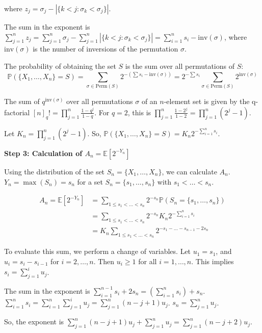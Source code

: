 \documentclass[12pt,a4paper]{article}
\theoremstyle{definition}
\begin{document}
        where $z_j = \sigma_j - |\{k<j : \sigma_k < \sigma_j\}|$.

        The sum in the exponent is $\sum_{j=1}^n z_j = \sum_{j=1}^n \sigma_j - \sum_{j=1}^n |\{k<j : \sigma_k < \sigma_j\}| = \sum_{i=1}^n s_i - \text{inv}(\sigma)$, where $\text{inv}(\sigma)$ is the number of inversions of the permutation $\sigma$.

        The probability of obtaining the set $S$ is the sum over all permutations of $S$:
        \[ \mathbb{P}(\{X_1, \ldots, X_n\}=S) = \sum_{\sigma \in \text{Perm}(S)} 2^{-(\sum s_i - \text{inv}(\sigma))} = 2^{-\sum s_i} \sum_{\sigma \in \text{Perm}(S)} 2^{\text{inv}(\sigma)} \]

        The sum of $q^{\text{inv}(\sigma)}$ over all permutations $\sigma$ of an $n$-element set is given by the q-factorial $[n]_q! = \prod_{j=1}^n \frac{1-q^j}{1-q}$. For $q=2$, this is $\prod_{j=1}^n \frac{1-2^j}{1-2} = \prod_{j=1}^n (2^j-1)$.

        Let $K_n = \prod_{j=1}^n (2^j-1)$. So, $\mathbb{P}(\{X_1, \ldots, X_n\}=S) = K_n 2^{-\sum_{i=1}^n s_i}$.

        \textbf{Step 3: Calculation of $A_n = \mathbb{E}[2^{-Y_n}]$}

        Using the distribution of the set $S_n = \{X_1, \ldots, X_n\}$, we can calculate $A_n$.
        $Y_n = \max(S_n) = s_n$ for a set $S_n=\{s_1, \ldots, s_n\}$ with $s_1 < \ldots < s_n$.

        \begin{align*}
            A_n = \mathbb{E}[2^{-Y_n}] &= \sum_{1 \leq s_1 < \ldots < s_n} 2^{-s_n} \mathbb{P}(S_n=\{s_1, \ldots, s_n\}) \\
            &= \sum_{1 \leq s_1 < \ldots < s_n} 2^{-s_n} K_n 2^{-\sum_{i=1}^n s_i} \\
            &= K_n \sum_{1 \leq s_1 < \ldots < s_n} 2^{-s_1 - \ldots - s_{n-1} - 2s_n}
        \end{align*}

        To evaluate this sum, we perform a change of variables. Let $u_1=s_1$, and $u_i = s_i - s_{i-1}$ for $i=2, \ldots, n$.
        Then $u_i \geq 1$ for all $i=1, \ldots, n$.
        This implies $s_i = \sum_{j=1}^i u_j$.

        The sum in the exponent is $\sum_{i=1}^{n-1} s_i + 2s_n = (\sum_{i=1}^n s_i) + s_n$.
        $\sum_{i=1}^n s_i = \sum_{i=1}^n \sum_{j=1}^i u_j = \sum_{j=1}^n (n-j+1)u_j$.
        $s_n = \sum_{j=1}^n u_j$.

        So, the exponent is $\sum_{j=1}^n (n-j+1)u_j + \sum_{j=1}^n u_j = \sum_{j=1}^n (n-j+2)u_j$.
\end{document}
